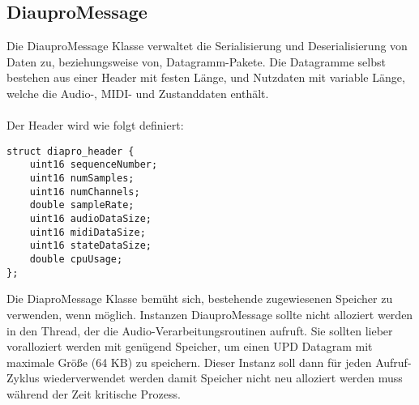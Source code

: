 \subsection{DiauproMessage}

Die DiauproMessage Klasse verwaltet die Serialisierung und Deserialisierung von Daten zu, beziehungsweise von, Datagramm-Pakete. Die Datagramme selbst bestehen aus einer Header mit festen Länge, und Nutzdaten mit variable Länge, welche die Audio-, MIDI- und Zustanddaten enthält.\\
\\
Der Header wird wie folgt definiert:

\begin{lstlisting}
struct diapro_header {
    uint16 sequenceNumber;
    uint16 numSamples;
    uint16 numChannels;
    double sampleRate;
    uint16 audioDataSize;
    uint16 midiDataSize;
    uint16 stateDataSize;
    double cpuUsage;
};
\end{lstlisting}

Die DiaproMessage Klasse bemüht sich, bestehende zugewiesenen Speicher zu verwenden, wenn möglich. Instanzen DiauproMessage sollte nicht alloziert werden in den Thread, der die Audio-Verarbeitungsroutinen aufruft. Sie sollten lieber voralloziert werden mit genügend Speicher, um einen UPD Datagram mit maximale Größe (64 KB) zu speichern. Dieser Instanz soll dann für jeden Aufruf-Zyklus wiederverwendet werden damit Speicher nicht neu alloziert werden muss während der Zeit kritische Prozess.
